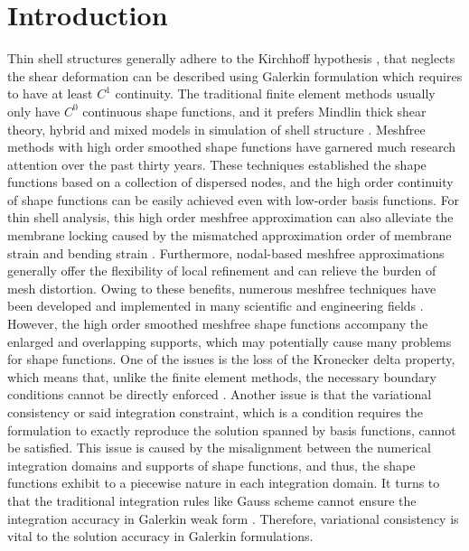 \section{Introduction}\label{introduction}
Thin shell structures generally adhere to the Kirchhoff hypothesis \cite{donnell1976}, that neglects the shear deformation can be described using Galerkin formulation which requires to have at least $C^1$ continuity. The traditional finite element methods usually only have $C^0$ continuous shape functions, and it prefers Mindlin thick shear theory, hybrid and mixed models in simulation of shell structure  \cite{hughes2000}. Meshfree methods \cite{belytschko1994,liu1995,chen2017} with high order smoothed shape functions have garnered much research attention over the past thirty years. These techniques established the shape functions based on a collection of dispersed nodes, and the high order continuity of shape functions can be easily achieved even with low-order basis functions. For thin shell analysis, this high order meshfree approximation can also alleviate the membrane locking caused by the mismatched approximation order of membrane strain and bending strain \cite{krysl1996}. Furthermore, nodal-based meshfree approximations generally offer the flexibility of local refinement and can relieve the burden of mesh distortion. Owing to these benefits, numerous meshfree techniques have been developed and implemented in many scientific and engineering fields \cite{liu2009,zhang2000,millan2011,wang2023b,suchde2022,deng2023a,wang2024}. However, the high order smoothed meshfree shape functions accompany the enlarged and overlapping supports, which may potentially cause many problems for shape functions. One of the issues is the loss of the Kronecker delta property, which means that, unlike the finite element methods, the necessary boundary conditions cannot be directly enforced  \cite{fernandez-mendez2004}. Another issue is that the variational consistency or said integration constraint, which is a condition requires the formulation to exactly reproduce the solution spanned by basis functions, cannot be satisfied. This issue is caused by the misalignment between the numerical integration domains and supports of shape functions, and thus, the shape functions exhibit to a piecewise nature in each integration domain. It turns to that the traditional integration rules like Gauss scheme cannot ensure the integration accuracy in Galerkin weak form \cite{li2016, wu2021}. Therefore, variational consistency is vital to the solution accuracy in Galerkin formulations.

